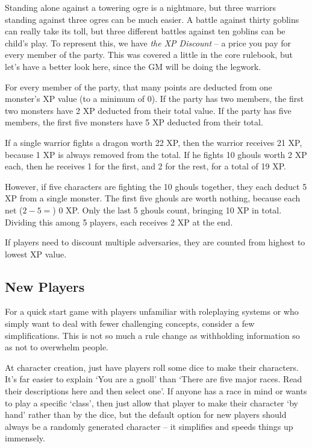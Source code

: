 Standing alone against a towering ogre is a nightmare, but three warriors standing against three ogres can be much easier.  A battle against thirty goblins can really take its toll, but three different battles against ten goblins can be child's play.  To represent this, we have \textit{the XP Discount} -- a price you pay for every member of the party.  This was covered a little in the core rulebook, but let's have a better look here, since the GM will be doing the legwork.

For every member of the party, that many points are deducted from one monster's XP value (to a minimum of 0).  If the party has two members, the first two monsters have 2 XP deducted from their total value.  If the party has five members, the first five monsters have 5 XP deducted from their total.

If a single warrior fights a dragon worth 22 XP, then the warrior receives 21 XP, because 1 XP is always removed from the total.  If he fights 10 ghouls worth 2 XP each, then he receives 1 for the first, and 2 for the rest, for a total of 19 XP.

However, if five characters are fighting the 10 ghouls together, they each deduct 5 XP from a single monster.
The first five ghouls are worth nothing, because each net ($2 - 5 = $) 0 XP.  Only the last 5 ghouls count, bringing 10 XP in total.  Dividing this among 5 players, each receives 2 XP at the end.

If players need to discount multiple adversaries, they are counted from highest to lowest XP value.

\subsection{New Players}

For a quick start game with players unfamiliar with roleplaying systems or who simply want to deal with fewer challenging concepts, consider a few simplifications. This is not so much a rule change as withholding information so as not to overwhelm people.

At character creation, just have players roll some dice to make their characters.  It's far easier to explain `You are a gnoll' than `There are five major races.  Read their descriptions here and then select one'.  If anyone has a race in mind or wants to play a specific `class', then just allow that player to make their character `by hand' rather than by the dice, but the default option for new players should always be a randomly generated character -- it simplifies and speeds things up  immensely.

